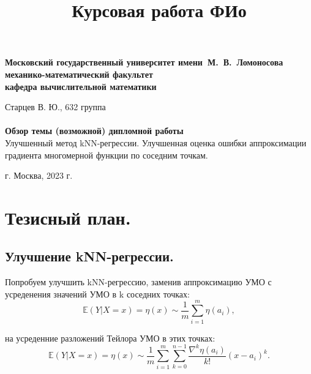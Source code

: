 \documentclass[12 pt, russian]{article}
\title{Курсовая работа ФИо}
\begin{document}
\thispagestyle{empty}
\newtheorem{Thm}{Теорема}[section]
\newtheorem{Statemnt}{Утверждение}[section]
\newtheorem{Problem}{Задача}[section]
\newtheorem{Lemm}{Лемма}[section]
\newtheorem{Rem}{Замечание}[section]
\newtheorem{Cor}{Следствие}[section]
\theoremstyle{definition}
\newtheorem{Exam}{Пример}[section]
\newtheorem{Dfn}{Определение}[section]
\newtheorem*{theorem*}{Теорема}
\sloppy
\begin{titlepage}
\begin{center}
\textbf{
Московский государственный университет имени~М.~В.~Ломоносова\\
механико-математический факультет\\
кафедра вычислительной математики}\\
\centering

\vspace*{200pt} 
\large {Старцев В. Ю., 632 группа} \\ 
\vspace{30pt}
\vspace{10pt} {\Large{\textbf{}}\\}
\textbf{Обзор темы (возможной) дипломной работы} \\
\vspace{10pt}
Улучшенный метод kNN-регрессии. Улучшенная оценка ошибки аппроксимации градиента многомерной функции по соседним точкам.
\vspace*{40pt}

\vspace*{\fill} г. Москва, 2023 г.
\end{center}
\end{titlepage}

	
\section{Тезисный план.}
\subsection{Улучшение kNN-регрессии.}

Попробуем улучшить kNN-регрессию, заменив аппроксимацию УМО с усреденения значений УМО в k соседних точках: \[\mathbb{E}(Y| X=x) = \eta(x) \sim \frac{1}{m}\sum_{i=1}^m \eta(a_i),\]

на усреденние разложений Тейлора УМО в этих точках:
\[
    \mathbb{E}(Y| X=x) = \eta(x) \sim \frac{1}{m}\sum_{i=1}^m \sum_{k=0}^{n-1}\frac{\nabla^k\eta(a_i)}{k!}(x-a_i)^k.
\]
\end{document}
